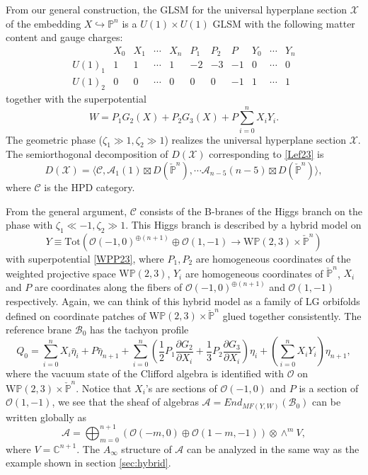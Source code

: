 \documentclass[a4paper,11pt]{article}
\numberwithin{equation}{section}
\begin{document}
From our general construction, the GLSM for the universal hyperplane section $\mathcal{X}$ of the embedding $X \hookrightarrow \mathbb{P}^n$ is a $U(1) \times U(1)$ GLSM with the following matter content and gauge charges:
\[
\begin{array}{ccccccccccc}
& X_0 & X_1 & \cdots & X_n & P_1 & P_2 & P & Y_0 & \cdots & Y_n \\
U(1)_1 & 1 & 1 & \cdots & 1 & -2 & -3 & -1 & 0 & \cdots & 0 \\
U(1)_2 & 0 & 0 & \cdots & 0 & 0 & 0 & -1 & 1 & \cdots & 1
\end{array}
\]
together with the superpotential
\begin{equation}\label{WPP23}
W = P_1 G_2(X) + P_2 G_3(X) + P \sum_{i=0}^n X_i Y_i.
\end{equation}
The geometric phase ($\zeta_1 \gg 1, \zeta_2 \gg 1$) realizes the universal hyperplane section $\mathcal{X}$. The semiorthogonal decomposition of $D(\mathcal{X})$ corresponding to \eqref{Lef23} is
\[
D(\mathcal{X}) = \langle \mathcal{C}, \mathcal{A}_1(1) \boxtimes D(\check{\mathbb{P}}^n), \cdots \mathcal{A}_{n-5}(n-5) \boxtimes D(\check{\mathbb{P}}^n) \rangle,
\]
where $\mathcal{C}$ is the HPD category. 

From the general argument, $\mathcal{C}$ consists of the B-branes of the Higgs branch on the phase with $\zeta_1 \ll -1, \zeta_2 \gg 1$. This Higgs branch is described by a hybrid model on
\[
Y \equiv \mathrm{Tot}\left( \mathcal{O}(-1,0)^{\oplus(n+1)} \oplus \mathcal{O}(1,-1) 
\rightarrow \mathrm{W}\mathbb{P}(2,3) \times \check{\mathbb{P}}^n 
\right)
\]
with superpotential \eqref{WPP23}, where $P_1, P_2$ are homogeneous coordinates of the weighted projective space 
$\mathrm{W}\mathbb{P}(2,3)$, $Y_i$ are homogeneous coordinates of 
$\check{\mathbb{P}}^n$, $X_i$ and $P$ are coordinates along the fibers of 
$\mathcal{O}(-1,0)^{\oplus(n+1)}$ and $\mathcal{O}(1,-1)$ respectively. Again, we can think of this hybrid model as a family of LG orbifolds defined on coordinate patches of $\mathrm{W}\mathbb{P}(2,3) \times \check{\mathbb{P}}^n$ glued together consistently.
The reference brane $\mathcal{B}_0$ has the tachyon profile
\[
Q_{0} = \sum_{i=0}^n X_i \bar{\eta}_i + P \bar{\eta}_{n+1} + \sum_{i=0}^n \left( \frac{1}{2} P_1 \frac{\partial G_2}{\partial X_i} + \frac{1}{3} P_2 \frac{\partial G_3}{\partial X_i} \right) \eta_i + \left( \sum_{i=0}^n X_i Y_i \right) \eta_{n+1},
\]
where the vacuum state of the Clifford algebra is identified with $\mathcal{O}$ 
on $\mathrm{W}\mathbb{P}(2,3) \times \check{\mathbb{P}}^n$. Notice that $X_i$'s 
are sections of $\mathcal{O}(-1,0)$ and $P$ is a section of $\mathcal{O}(1,-1)$, 
we see that the sheaf of algebras $\mathcal{A}=End_{MF(Y,W)}(\mathcal{B}_0)$ 
can be written globally as
\[
\mathcal{A} = \bigoplus_{m=0}^{n+1} \left( \mathcal{O}(-m,0) \oplus \mathcal{O}(1-m,-1) \right) \otimes \wedge^m V,
\]
where $V = \mathbb{C}^{n+1}$. The $A_\infty$ structure of $\mathcal{A}$ can be analyzed in the same way as the example shown in section \ref{sec:hybrid}.
\end{document}
